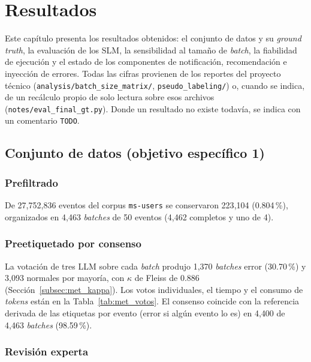 \chapter{Resultados}\label{cap:resultados}

Este capítulo presenta los resultados obtenidos: el conjunto de datos y su \textit{ground truth}, la evaluación de los SLM, la sensibilidad al tamaño de \textit{batch}, la fiabilidad de ejecución y el estado de los componentes de notificación, recomendación e inyección de errores. Todas las cifras provienen de los reportes del proyecto técnico (\texttt{analysis/batch\_size\_matrix/}, \texttt{pseudo\_labeling/}) o, cuando se indica, de un recálculo propio de solo lectura sobre esos archivos (\texttt{notes/eval\_final\_gt.py}). Donde un resultado no existe todavía, se indica con un comentario \texttt{TODO}.

\section{Conjunto de datos (objetivo específico 1)}\label{sec:res_dataset}

\subsection{Prefiltrado}

De 27{,}752{,}836 eventos del corpus \texttt{ms-users} se conservaron 223{,}104 (0.804\,\%), organizados en 4{,}463 \textit{batches} de 50 eventos (4{,}462 completos y uno de 4). %

\subsection{Preetiquetado por consenso}

La votación de tres LLM sobre cada \textit{batch} produjo 1{,}370 \textit{batches} error (30.70\,\%) y 3{,}093 normales por mayoría, con $\kappa$ de Fleiss de 0.886 (Sección~\ref{subsec:met_kappa}). Los votos individuales, el tiempo y el consumo de \textit{tokens} están en la Tabla~\ref{tab:met_votos}. El consenso coincide con la referencia derivada de las etiquetas por evento (error si algún evento lo es) en 4{,}400 de 4{,}463 \textit{batches} (98.59\,\%).

\subsection{Revisión experta}


